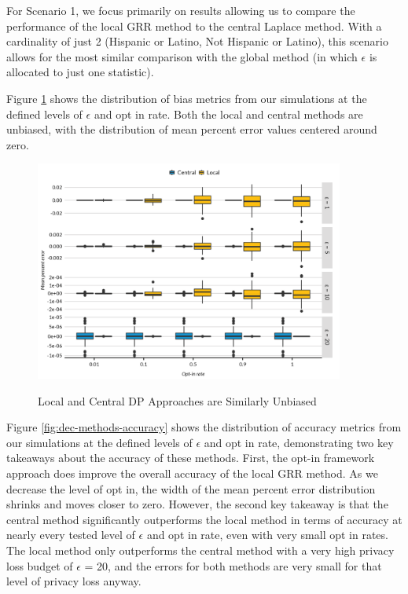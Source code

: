 \documentclass[
]{urban-formatting}
\begin{document}
For Scenario 1, we focus primarily on results allowing us to compare the
performance of the local GRR method to the central Laplace method. With
a cardinality of just 2 (Hispanic or Latino, Not Hispanic or Latino),
this scenario allows for the most similar comparison with the global
method (in which \(\epsilon\) is allocated to just one statistic).

Figure \ref{fig:dec-methods-bias} shows the distribution of bias metrics
from our simulations at the defined levels of \(\epsilon\) and opt in
rate. Both the local and central methods are unbiased, with the
distribution of mean percent error values centered around zero.

\begin{figure}[!htb]
    \centering
    \caption{Local and Central DP Approaches are Similarly Unbiased}
    \includegraphics[width=4in]{../analysis/figures/dec-methods-bias.png}
    \label{fig:dec-methods-bias}
\end{figure}

Figure \ref{fig:dec-methods-accuracy} shows the distribution of accuracy
metrics from our simulations at the defined levels of \(\epsilon\) and
opt in rate, demonstrating two key takeaways about the accuracy of these
methods. First, the opt-in framework approach does improve the overall
accuracy of the local GRR method. As we decrease the level of opt in,
the width of the mean percent error distribution shrinks and moves
closer to zero. However, the second key takeaway is that the central
method significantly outperforms the local method in terms of accuracy
at nearly every tested level of \(\epsilon\) and opt in rate, even with
very small opt in rates. The local method only outperforms the central
method with a very high privacy loss budget of \(\epsilon\) = 20, and
the errors for both methods are very small for that level of privacy
loss anyway.
\end{document}
